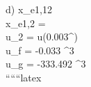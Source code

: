 d) \quad x_{e1,12} \\
\quad x_{e1,2} =  \\
\quad u_2 = u(0.003^\circ {}) \\
\quad u_f = -0.033 ^3  \\
\quad u_g = -333.492 ^3  \\

``````latex